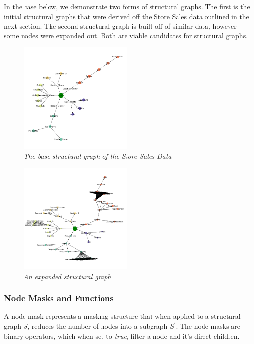In the case below, we demonstrate two forms of structural graphs. The first is the initial structural graphs that were derived off the Store Sales data outlined in the next section. The second structural graph is built off of similar data, however some nodes were expanded out. Both are viable candidates for structural graphs.

\begin{figure}
	\centering
        \includegraphics[width=0.5\textwidth]{images/base_hierarchy.png}
	\caption{\textit{The base structural graph of the Store Sales Data}}
	\label{fig:base_hierarchy}
\end{figure}


\begin{figure}
	\centering
        \includegraphics[width=0.5\textwidth]{images/expanded_node_structure.png}
	\caption{\textit{An expanded structural graph}}
	\label{fig:expanded_node_structure}
\end{figure}

\subsubsection{Node Masks and Functions}
\label{sec:Filters}
A node mask represents a masking structure that when applied to a structural graph $S$, reduces the number of nodes into a subgraph $S^{'}$. The node masks are binary operators, which when set to \textit{true}, filter a node and it's direct children.

